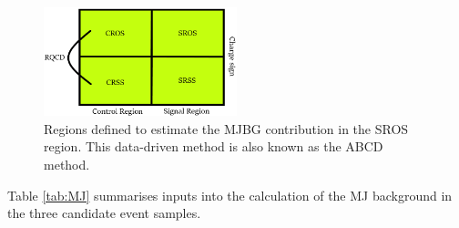 \begin{figure}[htbp]
	\centering
	\includegraphics[width=0.5\textwidth]{figures/Fig7.png}
	\caption{Regions defined to estimate the MJBG contribution in the SROS region. This data-driven method is also known as the ABCD method.}
	\label{Fig7}
\end{figure}
Table \ref{tab:MJ} summarises inputs into the calculation of the MJ background in the three candidate event samples. 

